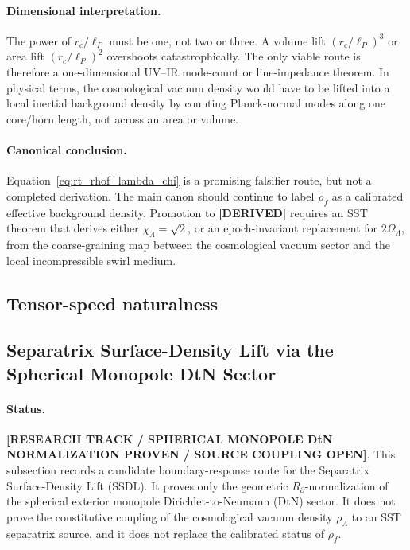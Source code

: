 \paragraph{Dimensional interpretation.}
The power of \(r_c/\ell_P\) must be one, not two or three. A volume lift
\((r_c/\ell_P)^3\) or area lift \((r_c/\ell_P)^2\) overshoots catastrophically.
The only viable route is therefore a one-dimensional UV--IR mode-count or
line-impedance theorem. In physical terms, the cosmological vacuum density
would have to be lifted into a local inertial background density by counting
Planck-normal modes along one core/horn length, not across an area or volume.

\paragraph{Canonical conclusion.}
Equation~\eqref{eq:rt_rhof_lambda_chi} is a promising falsifier route, but
not a completed derivation. The main canon should continue to label
\(\rho_{\!f}\) as a calibrated effective background density. Promotion to
\textbf{[DERIVED]} requires an SST theorem that derives either
\(\chi_\Lambda=\sqrt{2}\), or an epoch-invariant replacement for
\(2\Omega_\Lambda\), from the coarse-graining map between the cosmological
vacuum sector and the local incompressible swirl medium.

\subsection{Tensor-speed naturalness}\subsection{Separatrix Surface-Density Lift via the Spherical Monopole DtN Sector}
\label{subsec:ssdl_monopole_dtn}

\paragraph{Status.}
\textbf{[RESEARCH TRACK / SPHERICAL MONOPOLE DtN NORMALIZATION PROVEN / SOURCE COUPLING OPEN]}.
This subsection records a candidate boundary-response route for the
Separatrix Surface-Density Lift (SSDL).  It proves only the geometric
\(R_\partial\)-normalization of the spherical exterior monopole
Dirichlet-to-Neumann (DtN) sector.  It does not prove the constitutive
coupling of the cosmological vacuum density \(\rho_\Lambda\) to an SST
separatrix source, and it does not replace the calibrated status of
\(\rho_{\!f}\).

